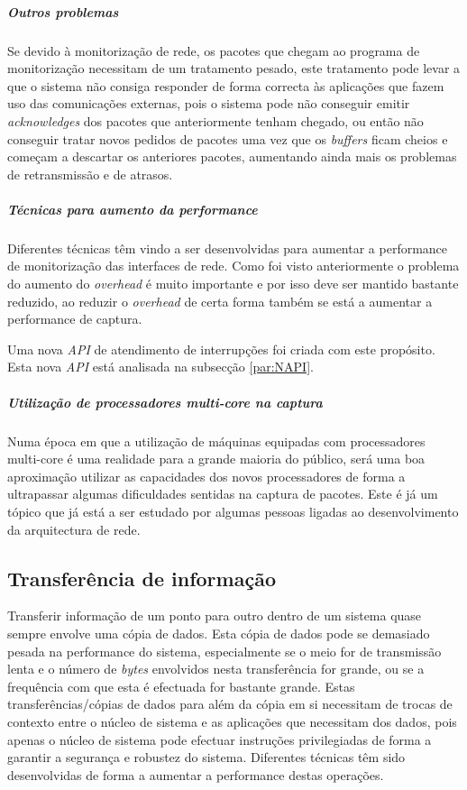 \subparagraph*{Outros problemas
}
Se devido à monitorização de rede, os pacotes que chegam ao programa de monitorização necessitam de um tratamento pesado, este tratamento pode levar a que o sistema não consiga responder de forma correcta às aplicações que fazem uso das comunicações externas, pois o sistema pode não conseguir emitir \textit{acknowledges} dos pacotes que anteriormente tenham chegado, ou então não conseguir tratar novos pedidos de pacotes uma vez que os \textit{buffers} ficam cheios e começam a descartar os anteriores pacotes, aumentando ainda mais os problemas de retransmissão e de atrasos.

\subparagraph*{Técnicas para aumento da performance}
Diferentes técnicas têm vindo a ser desenvolvidas para aumentar a performance de monitorização das interfaces de rede.
Como foi visto anteriormente o problema do aumento do \textit{overhead} é muito importante e por isso deve ser mantido bastante reduzido, ao reduzir o \textit{overhead} de certa forma também se está a aumentar a performance de captura.

Uma nova \textit{API} de atendimento de interrupções foi criada com este propósito.
Esta nova \textit{API} está analisada na subsecção \ref{par:NAPI}.

\subparagraph*{Utilização de processadores \textit{multi-core} na captura}
Numa época em que a utilização de máquinas equipadas com processadores multi-core é uma realidade para a grande maioria do público, será uma boa aproximação utilizar as capacidades dos novos processadores de forma a ultrapassar algumas dificuldades sentidas na captura de pacotes.
Este é já um tópico que já está a ser estudado por algumas pessoas ligadas ao desenvolvimento da arquitectura de rede.


\subsection{Transferência de informação}\label{sect:transf_information}


Transferir informação de um ponto para outro dentro de um sistema quase sempre envolve uma cópia de dados.
Esta cópia de dados pode se demasiado pesada na performance do sistema, especialmente se o meio for de transmissão lenta e o número de \textit{bytes} envolvidos nesta transferência for grande, ou se a frequência com que esta é efectuada for bastante grande.
Estas transferências/cópias de dados para além da cópia em si necessitam de trocas de contexto entre o núcleo de sistema e as aplicações que necessitam dos dados, pois apenas o núcleo de sistema pode efectuar instruções privilegiadas de forma a garantir a segurança e robustez do sistema.
Diferentes técnicas têm sido desenvolvidas de forma a aumentar a performance destas operações. 


